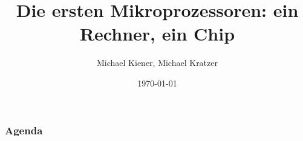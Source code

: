 \documentclass{beamer}
\begin{document}
	
\title{Die ersten Mikroprozessoren: ein Rechner, ein Chip}
\author{Michael Kiener, Michael Kratzer}
\date{\today}
	
\maketitle
\begin{frame}
	\frametitle{Agenda}
	\setcounter{tocdepth}{1}
	\tableofcontents
	\setcounter{tocdepth}{3}
\end{frame}




\end{document}
